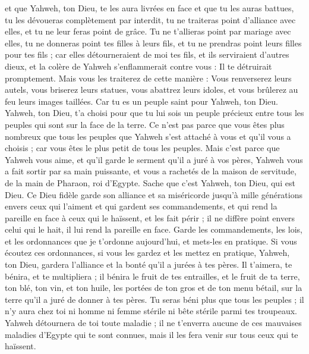 \begin{multicols}{2}
et que Yahweh, ton Dieu, te les aura livrées en face et que tu les auras battues, tu les dévoueras complètement par interdit, tu ne traiteras point d’alliance avec elles, et tu ne leur feras point de grâce.
Tu ne t'allieras point par mariage avec elles, tu ne donneras point tes filles à leurs fils, et tu ne prendras point leurs filles pour tes fils ;
car elles détourneraient de moi tes fils, et ils serviraient d'autres dieux, et la colère de Yahweh s'enflammerait contre vous : Il te détruirait promptement.
Mais vous les traiterez de cette manière : Vous renverserez leurs autels, vous briserez leurs statues, vous abattrez leurs idoles, et vous brûlerez au feu leurs images taillées.
Car tu es un peuple saint pour Yahweh, ton Dieu. Yahweh, ton Dieu, t'a choisi pour que tu lui sois un peuple précieux entre tous les peuples qui sont sur la face de la terre.
Ce n'est pas parce que vous êtes plus nombreux que tous les peuples que Yahweh s’est attaché à vous et qu’il vous a choisis ; car vous êtes le plus petit de tous les peuples.
Mais c'est parce que Yahweh vous aime, et qu'il garde le serment qu’il a juré à vos pères, Yahweh vous a fait sortir par sa main puissante, et vous a rachetés de la maison de servitude, de la main de Pharaon, roi d'Egypte.
Sache que c'est Yahweh, ton Dieu, qui est Dieu. Ce Dieu fidèle garde son alliance et sa miséricorde jusqu'à mille générations envers ceux qui l'aiment et qui gardent ses commandements,
et qui rend la pareille en face à ceux qui le haïssent, et les fait périr ; il ne diffère point envers celui qui le hait, il lui rend la pareille en face.
Garde les commandements, les lois, et les ordonnances que je t’ordonne aujourd'hui, et mets-les en pratique.
Si vous écoutez ces ordonnances, si vous les gardez et les mettez en pratique, Yahweh, ton Dieu, gardera l'alliance et la bonté qu'il a jurées à tes pères.
Il t'aimera, te bénira, et te multipliera ; il bénira le fruit de tes entrailles, et le fruit de ta terre, ton blé, ton vin, et ton huile, les portées de ton gros et de ton menu bétail, sur la terre qu'il a juré de donner à tes pères.
Tu seras béni plus que tous les peuples ; il n'y aura chez toi ni homme ni femme stérile ni bête stérile parmi tes troupeaux.
Yahweh détournera de toi toute maladie ; il ne t’enverra aucune de ces mauvaises maladies d'Egypte qui te sont connues, mais il les fera venir sur tous ceux qui te haïssent.

\end{multicols}
